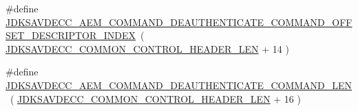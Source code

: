\begin{DoxyCompactItemize}
\#define \hyperlink{group__command__deauthenticate_gac29b07daf809059ed6d15d2325d036a0}{J\+D\+K\+S\+A\+V\+D\+E\+C\+C\+\_\+\+A\+E\+M\+\_\+\+C\+O\+M\+M\+A\+N\+D\+\_\+\+D\+E\+A\+U\+T\+H\+E\+N\+T\+I\+C\+A\+T\+E\+\_\+\+C\+O\+M\+M\+A\+N\+D\+\_\+\+O\+F\+F\+S\+E\+T\+\_\+\+D\+E\+S\+C\+R\+I\+P\+T\+O\+R\+\_\+\+I\+N\+D\+EX}~( \hyperlink{group__jdksavdecc__avtp__common__control__header_gaae84052886fb1bb42f3bc5f85b741dff}{J\+D\+K\+S\+A\+V\+D\+E\+C\+C\+\_\+\+C\+O\+M\+M\+O\+N\+\_\+\+C\+O\+N\+T\+R\+O\+L\+\_\+\+H\+E\+A\+D\+E\+R\+\_\+\+L\+EN} + 14 )
\item 
\#define \hyperlink{group__command__deauthenticate_ga4d0ff409a7a6e6a94b332c5551942a31}{J\+D\+K\+S\+A\+V\+D\+E\+C\+C\+\_\+\+A\+E\+M\+\_\+\+C\+O\+M\+M\+A\+N\+D\+\_\+\+D\+E\+A\+U\+T\+H\+E\+N\+T\+I\+C\+A\+T\+E\+\_\+\+C\+O\+M\+M\+A\+N\+D\+\_\+\+L\+EN}~( \hyperlink{group__jdksavdecc__avtp__common__control__header_gaae84052886fb1bb42f3bc5f85b741dff}{J\+D\+K\+S\+A\+V\+D\+E\+C\+C\+\_\+\+C\+O\+M\+M\+O\+N\+\_\+\+C\+O\+N\+T\+R\+O\+L\+\_\+\+H\+E\+A\+D\+E\+R\+\_\+\+L\+EN} + 16 )
\end{DoxyCompactItemize}
